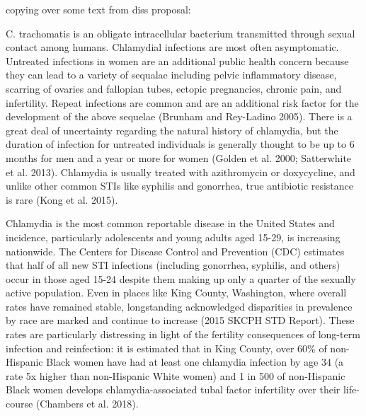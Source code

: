 \documentclass [11pt, proquest] {uwthesis}[2015/03/03]
\begin{document}
copying over some text from diss proposal:

C. trachomatis is an obligate intracellular bacterium transmitted
through sexual contact among humans. Chlamydial infections are most
often asymptomatic. Untreated infections in women are an additional
public health concern because they can lead to a variety of sequalae
including pelvic inflammatory disease, scarring of ovaries and fallopian
tubes, ectopic pregnancies, chronic pain, and infertility. Repeat
infections are common and are an additional risk factor for the
development of the above sequelae (Brunham and Rey-Ladino 2005). There
is a great deal of uncertainty regarding the natural history of
chlamydia, but the duration of infection for untreated individuals is
generally thought to be up to 6 months for men and a year or more for
women (Golden et al. 2000; Satterwhite et al. 2013). Chlamydia is
usually treated with azithromycin or doxycycline, and unlike other
common STIs like syphilis and gonorrhea, true antibiotic resistance is
rare (Kong et al. 2015).

Chlamydia is the most common reportable disease in the United States and
incidence, particularly adolescents and young adults aged 15-29, is
increasing nationwide. The Centers for Disease Control and Prevention
(CDC) estimates that half of all new STI infections (including
gonorrhea, syphilis, and others) occur in those aged 15-24 despite them
making up only a quarter of the sexually active population. Even in
places like King County, Washington, where overall rates have remained
stable, longstanding acknowledged disparities in prevalence by race are
marked and continue to increase (2015 SKCPH STD Report). These rates are
particularly distressing in light of the fertility consequences of
long-term infection and reinfection: it is estimated that in King
County, over 60\% of non-Hispanic Black women have had at least one
chlamydia infection by age 34 (a rate 5x higher than non-Hispanic White
women) and 1 in 500 of non-Hispanic Black women develops
chlamydia-associated tubal factor infertility over their life-course
(Chambers et al. 2018).
\end{document}

